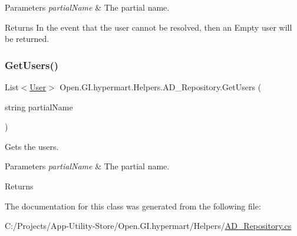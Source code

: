 \begin{DoxyParams}{Parameters}
{\em partial\+Name} & The partial name.\\
\hline
\end{DoxyParams}
\begin{DoxyReturn}{Returns}
In the event that the user cannot be resolved, then an Empty user will be returned.
\end{DoxyReturn}
\hypertarget{class_open_1_1_g_i_1_1hypermart_1_1_helpers_1_1_a_d___repository_acf1eb85047c96cf0925f10a7acd96859}{}\label{class_open_1_1_g_i_1_1hypermart_1_1_helpers_1_1_a_d___repository_acf1eb85047c96cf0925f10a7acd96859} 
\subsubsection{\texorpdfstring{Get\+Users()}{GetUsers()}}
{\footnotesize\ttfamily List$<$\hyperlink{class_open_1_1_g_i_1_1hypermart_1_1_models_1_1_user}{User}$>$ Open.\+G\+I.\+hypermart.\+Helpers.\+A\+D\+\_\+\+Repository.\+Get\+Users (\begin{DoxyParamCaption}\item[{string}]{partial\+Name }\end{DoxyParamCaption})}



Gets the users. 


\begin{DoxyParams}{Parameters}
{\em partial\+Name} & The partial name.\\
\hline
\end{DoxyParams}
\begin{DoxyReturn}{Returns}

\end{DoxyReturn}


The documentation for this class was generated from the following file\+:\begin{DoxyCompactItemize}
\item 
C\+:/\+Projects/\+App-\/\+Utility-\/\+Store/\+Open.\+G\+I.\+hypermart/\+Helpers/\hyperlink{_a_d___repository_8cs}{A\+D\+\_\+\+Repository.\+cs}\end{DoxyCompactItemize}
